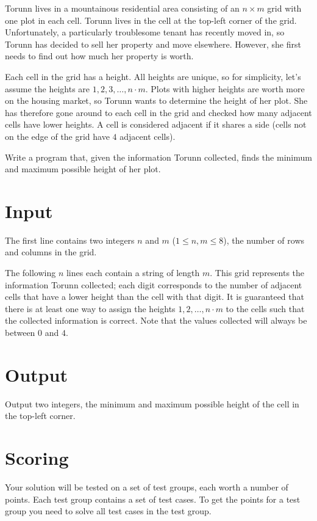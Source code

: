 
\noindent
Torunn lives in a mountainous residential area consisting of an $n \times m$ grid with one plot in each cell.
Torunn lives in the cell at the top-left corner of the grid.
Unfortunately, a particularly troublesome tenant has recently moved in, so Torunn has decided to sell her property and move elsewhere.
However, she first needs to find out how much her property is worth.

Each cell in the grid has a height. All heights are unique, so for simplicity, let's assume the heights are $1, 2, 3, \dots, n \cdot m$.
Plots with higher heights are worth more on the housing market, so Torunn wants to determine the height of her plot. She has therefore gone around to each cell in the grid and checked how many adjacent cells have lower heights.
A cell is considered adjacent if it shares a side (cells not on the edge of the grid have $4$ adjacent cells).

Write a program that, given the information Torunn collected, finds the minimum and maximum possible height of her plot.

\section*{Input}
The first line contains two integers $n$ and $m$ ($1 \leq n, m \leq 8$), the number of rows and columns in the grid.

The following $n$ lines each contain a string of length $m$.
This grid represents the information Torunn collected; each digit corresponds to the number of adjacent cells that have a lower height than the cell with that digit.
It is guaranteed that there is at least one way to assign the heights $1, 2, \dots, n \cdot m$ to the cells such that the collected information is correct.
Note that the values collected will always be between $0$ and $4$.

\section*{Output}
Output two integers, the minimum and maximum possible height of the cell in the top-left corner.

\section*{Scoring}
Your solution will be tested on a set of test groups, each worth a number of points. Each test group contains
a set of test cases. To get the points for a test group you need to solve all test cases in the test group.


